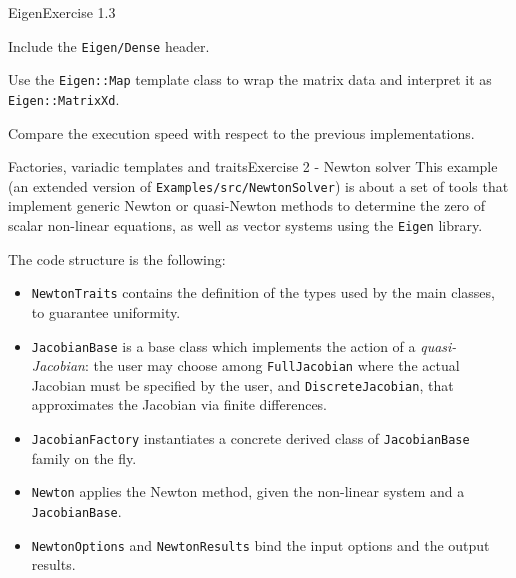 \documentclass[10pt]{beamer}
\begin{document}
\begin{frame}{Eigen}{Exercise 1.3}
\begin{itemize}
{\color{black}\item Include the {\tt Eigen/Dense} header.
\item Use the {\tt Eigen::Map} template class to wrap the matrix data and interpret it as {\tt Eigen::MatrixXd}.}
{\item Compare the execution speed with respect to the previous implementations.}
\end{itemize}
\end{frame}

\begin{frame}{Factories, variadic templates and traits}{Exercise 2 - Newton solver}
	This example (an extended version of \texttt{Examples/src/NewtonSolver}) is about a set of tools that implement generic Newton or quasi-Newton methods to determine the zero of scalar non-linear equations, as well as vector systems using the \texttt{Eigen} library.
	
	The code structure is the following:
	\begin{itemize}
		\item \texttt{NewtonTraits} contains the definition of the types used by the main classes, to guarantee uniformity.
		\item \texttt{JacobianBase} is a base class which implements the action of a \textit{quasi-Jacobian}: the user may choose among \texttt{FullJacobian} where the actual Jacobian must be specified by the user, and \texttt{DiscreteJacobian}, that approximates the Jacobian via finite differences.
		\item \texttt{JacobianFactory} instantiates a concrete derived class of \texttt{JacobianBase} family on the fly.
		\item \texttt{Newton} applies the Newton method, given the non-linear system and a \texttt{JacobianBase}.
		\item \texttt{NewtonOptions} and \texttt{NewtonResults} bind the input options and the output results.
	\end{itemize}
\end{frame}
\end{document}
